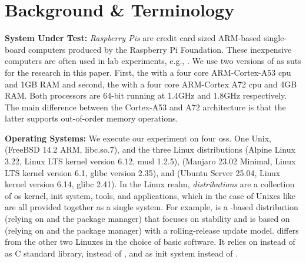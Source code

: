 \section{Background \& Terminology}\label{sec:background}

\noindent\textbf{System Under Test:} \emph{Raspberry Pis} are credit card sized ARM-based single-board computers produced by the Raspberry Pi Foundation\cite{raspberry_pi_website}.
These inexpensive computers are often used in lab experiments, e.g., \cite{zhao2015exploring,pfeiffer2024energy}.
We use two versions of  as \glspl{sut} for the research in this paper.
First, the  with a four core ARM-Cortex-A53 \gls{cpu} and 1GB RAM and second, the  with a four core ARM-Cortex A72 \gls{cpu} and 4GB RAM.
Both processors are 64-bit running at 1.4GHz and 1.8GHz respectively.
The main difference between the Cortex-A53 and A72 architecture is that the latter supports out-of-order memory operations.

\noindent\textbf{Operating Systems:} We execute our experiment on four \glspl{os}.
One Unix, \cite{freebsd_website}(FreeBSD 14.2 ARM, libc.so.7), and the three Linux distributions (Alpine Linux 3.22, Linux LTS kernel version 6.12, musl 1.2.5)\cite{alpine_website}, (Manjaro 23.02 Minimal, Linux LTS kernel version 6.1, glibc version 2.35)\cite{manjaro_website}, and (Ubuntu Server 25.04, Linux kernel version 6.14, glibc 2.41)\cite{ubuntu_website}.
In the Linux realm, \emph{distributions} are a collection of \gls{os} kernel, init system, tools, and applications, which in the case of Unixes like  are all provided together as a single system.
For example,  is a -based distribution (relying on  and the  package manager) that focuses on stability and  is based on  (relying on  and the  package manager) with a rolling-release update model.
 differs from the other two Linuxes in the choice of basic software.
It relies on  instead of  as C standard library,  instead of , and  as init system instead of .

